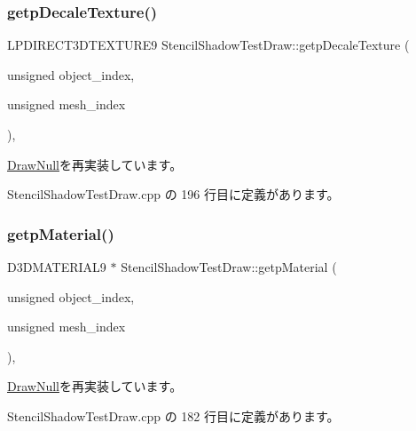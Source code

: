 \subsubsection{\texorpdfstring{getp\+Decale\+Texture()}{getpDecaleTexture()}}
{\footnotesize\ttfamily L\+P\+D\+I\+R\+E\+C\+T3\+D\+T\+E\+X\+T\+U\+R\+E9 Stencil\+Shadow\+Test\+Draw\+::getp\+Decale\+Texture (\begin{DoxyParamCaption}\item[{unsigned}]{object\+\_\+index,  }\item[{unsigned}]{mesh\+\_\+index }\end{DoxyParamCaption})\hspace{0.3cm}{\ttfamily [override]}, {\ttfamily [virtual]}}



\mbox{\hyperlink{class_draw_null_a2dfa2d2cbb66249f933420a38e9cadad}{Draw\+Null}}を再実装しています。



 Stencil\+Shadow\+Test\+Draw.\+cpp の 196 行目に定義があります。

\mbox{\label{class_stencil_shadow_test_draw_aacdc680646f832451ea575f1da1eec9a}} 
\subsubsection{\texorpdfstring{getp\+Material()}{getpMaterial()}}
{\footnotesize\ttfamily D3\+D\+M\+A\+T\+E\+R\+I\+A\+L9 $\ast$ Stencil\+Shadow\+Test\+Draw\+::getp\+Material (\begin{DoxyParamCaption}\item[{unsigned}]{object\+\_\+index,  }\item[{unsigned}]{mesh\+\_\+index }\end{DoxyParamCaption})\hspace{0.3cm}{\ttfamily [override]}, {\ttfamily [virtual]}}



\mbox{\hyperlink{class_draw_null_aa07d7e89e723b68ec257da0f63d43f70}{Draw\+Null}}を再実装しています。



 Stencil\+Shadow\+Test\+Draw.\+cpp の 182 行目に定義があります。

\mbox{\label{class_stencil_shadow_test_draw_a8ab105b75d673adc52698a8401c6525c}} 
